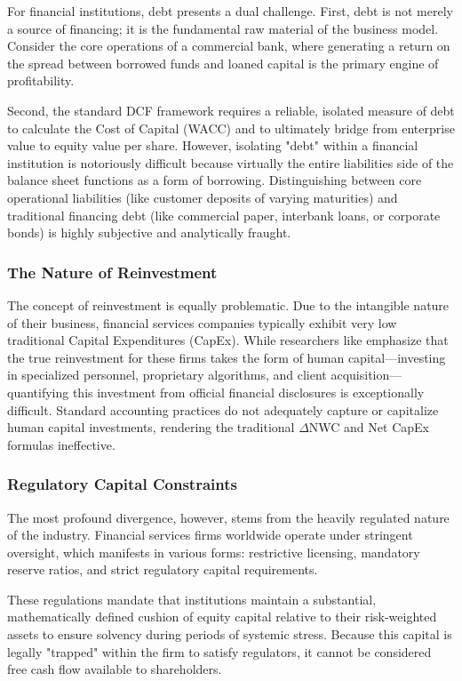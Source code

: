For financial institutions, debt presents a dual challenge. First, debt is not merely a source of financing; it is the fundamental raw material of the business model. Consider the core operations of a commercial bank, where generating a return on the spread between borrowed funds and loaned capital is the primary engine of profitability. 

Second, the standard DCF framework requires a reliable, isolated measure of debt to calculate the Cost of Capital (WACC) and to ultimately bridge from enterprise value to equity value per share. However, isolating "debt" within a financial institution is notoriously difficult because virtually the entire liabilities side of the balance sheet functions as a form of borrowing. Distinguishing between core operational liabilities (like customer deposits of varying maturities) and traditional financing debt (like commercial paper, interbank loans, or corporate bonds) is highly subjective and analytically fraught.

\subsubsection*{The Nature of Reinvestment}

The concept of reinvestment is equally problematic. Due to the intangible nature of their business, financial services companies typically exhibit very low traditional Capital Expenditures (CapEx). While researchers like \textcite{damodaran2025investment} emphasize that the true reinvestment for these firms takes the form of human capital—investing in specialized personnel, proprietary algorithms, and client acquisition—quantifying this investment from official financial disclosures is exceptionally difficult. Standard accounting practices do not adequately capture or capitalize human capital investments, rendering the traditional \(\Delta\)NWC and Net CapEx formulas ineffective.

\subsubsection*{Regulatory Capital Constraints}

The most profound divergence, however, stems from the heavily regulated nature of the industry. Financial services firms worldwide operate under stringent oversight, which manifests in various forms: restrictive licensing, mandatory reserve ratios, and strict regulatory capital requirements. 

These regulations mandate that institutions maintain a substantial, mathematically defined cushion of equity capital relative to their risk-weighted assets to ensure solvency during periods of systemic stress. Because this capital is legally "trapped" within the firm to satisfy regulators, it cannot be considered free cash flow available to shareholders. 

